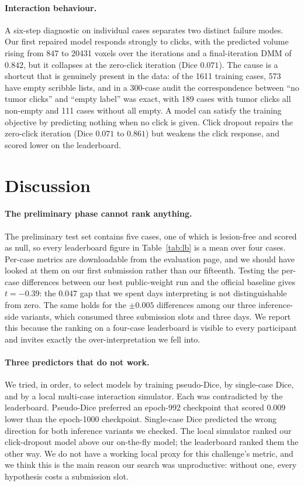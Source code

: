 \documentclass[runningheads]{llncs}
\begin{document}
\paragraph{Interaction behaviour.}
A six-step diagnostic on individual cases separates two distinct failure modes.
Our first repaired model responds strongly to clicks, with the predicted volume
rising from 847 to 20431 voxels over the iterations and a final-iteration DMM of
$0.842$, but it collapses at the zero-click iteration (Dice $0.071$). The cause
is a shortcut that is genuinely present in the data: of the 1611 training
cases, 573 have empty scribble lists, and in a 300-case audit the
correspondence between ``no tumor clicks'' and ``empty label'' was exact, with
189 cases with tumor clicks all non-empty and 111 cases without all empty. A
model can satisfy the training objective by predicting nothing when no click is
given. Click dropout repairs the zero-click iteration (Dice $0.071$ to
$0.861$) but weakens the click response, and scored lower on the leaderboard.

\section{Discussion}
\label{sec:discussion}

\paragraph{The preliminary phase cannot rank anything.}
The preliminary test set contains five cases, one of which is lesion-free and
scored as null, so every leaderboard figure in Table~\ref{tab:lb} is a mean
over four cases. Per-case metrics are downloadable from the evaluation page,
and we should have looked at them on our first submission rather than our
fifteenth. Testing the per-case differences between our best public-weight run
and the official baseline gives $t=-0.39$: the $0.047$ gap that we spent days
interpreting is not distinguishable from zero. The same holds for the
$\pm0.005$ differences among our three inference-side variants, which consumed
three submission slots and three days. We report this because the ranking on a
four-case leaderboard is visible to every participant and invites exactly the
over-interpretation we fell into.

\paragraph{Three predictors that do not work.}
We tried, in order, to select models by training pseudo-Dice, by single-case
Dice, and by a local multi-case interaction simulator. Each was contradicted by
the leaderboard. Pseudo-Dice preferred an epoch-992 checkpoint that scored
$0.009$ lower than the epoch-1000 checkpoint. Single-case Dice predicted the
wrong direction for both inference variants we checked. The local simulator
ranked our click-dropout model above our on-the-fly model; the leaderboard
ranked them the other way. We do not have a working local proxy for this
challenge's metric, and we think this is the main reason our search was
unproductive: without one, every hypothesis costs a submission slot.
\end{document}
